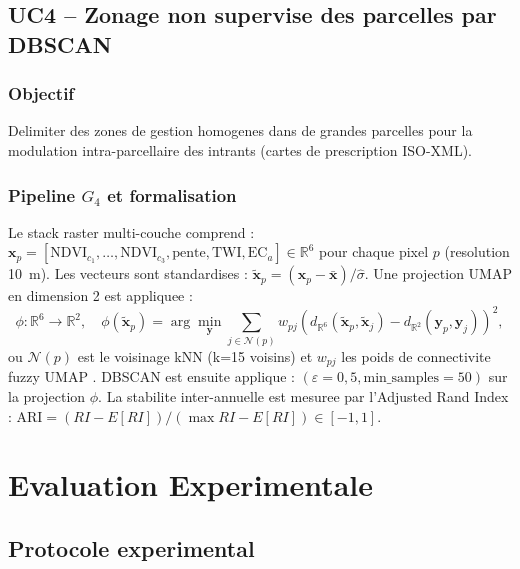 \documentclass[12pt,a4paper]{article}
\theoremstyle{plain}
\theoremstyle{definition}
\theoremstyle{remark}
\newcommand{\R}{\mathbb{R}}
\begin{document}
\subsection{UC4 -- Zonage non supervise des parcelles par DBSCAN}
\label{subsec:uc4}

\subsubsection{Objectif}

Delimiter des zones de gestion homogenes dans de grandes parcelles
pour la modulation intra-parcellaire des intrants (cartes de
prescription ISO-XML).

\subsubsection{Pipeline $G_4$ et formalisation}

Le stack raster multi-couche comprend :
$\bm{x}_p = [\text{NDVI}_{c_1}, \ldots, \text{NDVI}_{c_3},
             \text{pente}, \text{TWI}, \text{EC}_a] \in \R^6$
pour chaque pixel $p$ (resolution 10~m).
Les vecteurs sont standardises :
$\tilde{\bm{x}}_p = (\bm{x}_p - \bar{\bm{x}}) / \hat\sigma$.
Une projection UMAP en dimension 2 est appliquee :
\begin{equation}
\phi : \R^6 \to \R^2, \quad
\phi(\tilde{\bm{x}}_p) = \arg\min_{\bm{y}}
\sum_{j \in \mathcal{N}(p)} w_{pj} (d_{\R^6}(\tilde{\bm{x}}_p,
\tilde{\bm{x}}_j) - d_{\R^2}(\bm{y}_p, \bm{y}_j))^2,
\label{eq:umap}
\end{equation}
ou $\mathcal{N}(p)$ est le voisinage kNN (k=15 voisins) et
$w_{pj}$ les poids de connectivite fuzzy UMAP \cite{umap_paper}.
DBSCAN est ensuite applique :
$(\varepsilon=0{,}5, \text{min\_samples}=50)$ sur la projection $\phi$.
La stabilite inter-annuelle est mesuree par l'Adjusted Rand Index :
$\text{ARI} = (RI - E[RI]) / (\max RI - E[RI]) \in [-1,1]$.

\section{Evaluation Experimentale}
\label{sec:evaluation}

\subsection{Protocole experimental}
\end{document}

